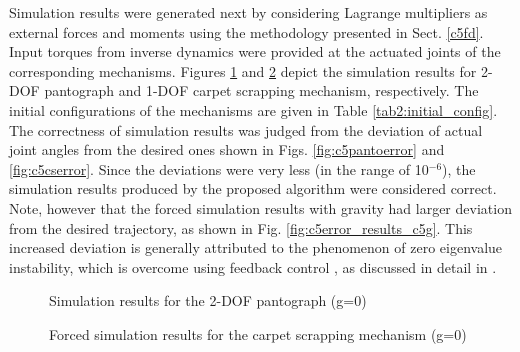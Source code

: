 {Simulation results were generated next by considering Lagrange multipliers as external forces and moments using the methodology presented in Sect. \ref{c5fd}. Input torques from inverse dynamics were provided at the actuated joints of the corresponding mechanisms. Figures \ref{fig:c5force_sim_results_panto_c5} and \ref{fig:c5force_sim_results_cs_c5} depict the simulation results for 2-DOF pantograph and 1-DOF carpet scrapping mechanism, respectively. The initial configurations of the mechanisms are given in Table \ref{tab2:initial_config}. The correctness of simulation results was judged from the deviation of actual joint angles from the desired ones shown in Figs. \ref{fig:c5pantoerror} and \ref{fig:c5cserror}. Since the deviations were very less (in the range of 10$^{-6}$), the simulation results produced by the proposed algorithm were considered correct. Note, however that the forced simulation results with gravity had larger deviation from the desired trajectory, as shown in Fig. \ref{fig:c5error_results_c5g}. This increased deviation is generally attributed to the phenomenon of zero eigenvalue instability, which is overcome using feedback control \citep{baumgarte1972stabilization}, as discussed in detail in \citet{khan2007modular}.
\begin{figure}[t!]
	\begin{center}
		\hspace{1pt}
	\end{center}
	\caption{Simulation results for the 2-DOF pantograph (g=0)}
	\label{fig:c5force_sim_results_panto_c5}
\end{figure}
\begin{figure}[t!]
	\begin{center} 
		\hspace{1pt}
	\end{center} 
\caption{Forced simulation results for the carpet scrapping mechanism (g=0)}
\label{fig:c5force_sim_results_cs_c5}
\end{figure}
\begin{figure}[t!]

\end{figure}}
